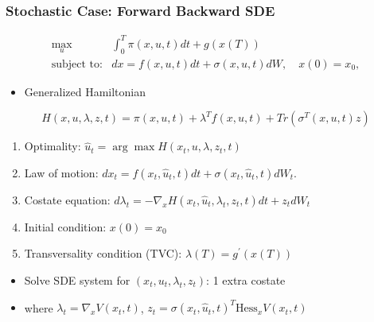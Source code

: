 \documentclass[bigger,handout]{beamer}
\begin{document}
\begin{frame}%

\frametitle{Stochastic Case: Forward Backward SDE}

\begin{equation*}
\begin{array}{rc}
\max_{u} & \int_{0}^{T}\pi (x,u,t)dt+g(x(T)) \\
\text{subject to:} & dx=f(x,u,t)dt+\sigma(x,u,t)dW,\quad x(0)=x_{0},%
\end{array}%
\end{equation*}%


\begin{itemize}
\item Generalized Hamiltonian
\end{itemize}
\begin{equation*}
H(x,u,\lambda,z,t) = \pi(x,u,t)+\lambda^{T}f(x,u,t)+Tr(\sigma^{T}(x,u,t)z)
\end{equation*}
\begin{enumerate}
\item Optimality: $\hat{u}_t=\arg\max H(x_t,u,\lambda,z_t,t)$

\item Law of motion: $dx_t=f(x_t,\hat{u}_t,t)dt+\sigma(x_t,\hat{u}_t,t)dW_t$.
 
\item Costate equation: $d\lambda_{t}=-\nabla_{x}H(x_t,\hat{u}_t,\lambda_t,z_t,t)dt+z_{t}dW_t$
\item Initial condition: $x(0)=x_{0}$
\item Transversality condition (TVC): $\lambda (T)=g^{\prime }(x(T))$

\end{enumerate}

\begin{itemize}
\item Solve SDE system for $(x_t,u_t,\lambda_t,z_t)$: 1 extra costate
\item where $\lambda_t=\nabla_{x}V(x_t,t)$, $z_t=\sigma(x_t,\hat{u}_t,t)^{T}\text{Hess}_{x}V(x_t,t)$
\end{itemize}



\end{frame}

% 
% 
% 
% 
 
\end{document}
